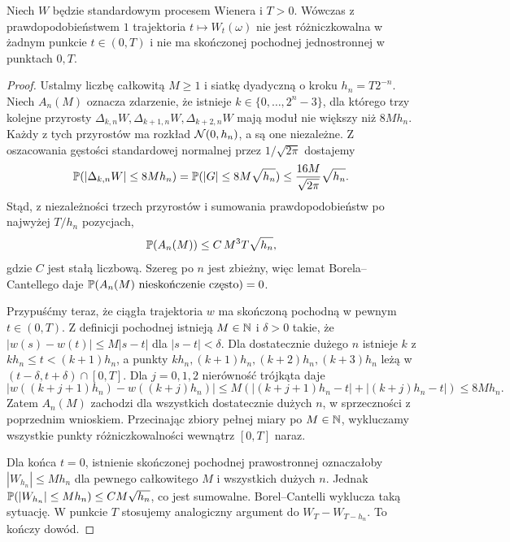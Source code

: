 \begin{twierdzenie}
Niech $W$ będzie standardowym procesem Wienera i $T>0$.
Wówczas z prawdopodobieństwem $1$ trajektoria
$t\mapsto W_t(\omega)$ nie jest różniczkowalna
w żadnym punkcie $t\in(0,T)$ i nie ma skończonej
pochodnej jednostronnej w punktach $0,T$.
\end{twierdzenie}
\begin{proof}
Ustalmy liczbę całkowitą $M\ge1$ i siatkę dyadyczną
o kroku $h_n=T2^{-n}$. Niech $A_n(M)$ oznacza zdarzenie,
że istnieje $k\in\{0,\ldots,2^n-3\}$, dla którego
trzy kolejne przyrosty
$\Delta_{k,n}W,\Delta_{k+1,n}W,\Delta_{k+2,n}W$
mają moduł nie większy niż $8Mh_n$.
Każdy z tych przyrostów ma rozkład $\mathcal{N}(0,h_n)$,
a są one niezależne. Z oszacowania gęstości standardowej
normalnej przez $1/\sqrt{2\pi}$ dostajemy
\[
\mathbb{P}(|\Delta_{k,n}W|\le8Mh_n)
=\mathbb{P}(|G|\le8M\sqrt{h_n})
\le \frac{16M}{\sqrt{2\pi}}\sqrt{h_n}.
\]
Stąd, z niezależności trzech przyrostów i sumowania
prawdopodobieństw po najwyżej $T/h_n$ pozycjach,
\[
\mathbb{P}(A_n(M))\le C\,M^3T\sqrt{h_n},
\]
gdzie $C$ jest stałą liczbową. Szereg po $n$ jest zbieżny,
więc lemat Borela--Cantellego daje
$\mathbb{P}(A_n(M)\text{ nieskończenie często})=0$.

Przypuśćmy teraz, że ciągła trajektoria $w$ ma skończoną
pochodną w pewnym $t\in(0,T)$. Z definicji pochodnej
istnieją $M\in\mathbb{N}$ i $\delta>0$ takie, że
$|w(s)-w(t)|\le M|s-t|$ dla $|s-t|<\delta$.
Dla dostatecznie dużego $n$ istnieje $k$ z
$kh_n\le t<(k+1)h_n$, a punkty
$kh_n,(k+1)h_n,(k+2)h_n,(k+3)h_n$
leżą w $(t-\delta,t+\delta)\cap[0,T]$.
Dla $j=0,1,2$ nierówność trójkąta daje
\[
|w((k+j+1)h_n)-w((k+j)h_n)|
\le M(|(k+j+1)h_n-t|+|(k+j)h_n-t|)
\le 8Mh_n.
\]
Zatem $A_n(M)$ zachodzi dla wszystkich dostatecznie
dużych $n$, w sprzeczności z poprzednim wnioskiem.
Przecinając zbiory pełnej miary po $M\in\mathbb{N}$,
wykluczamy wszystkie punkty różniczkowalności wewnątrz
$[0,T]$ naraz.

Dla końca $t=0$, istnienie skończonej pochodnej
prawostronnej oznaczałoby $|W_{h_n}|\le Mh_n$
dla pewnego całkowitego $M$ i wszystkich dużych $n$.
Jednak $\mathbb{P}(|W_{h_n}|\le Mh_n)\le C M\sqrt{h_n}$,
co jest sumowalne. Borel--Cantelli wyklucza taką
sytuację. W punkcie $T$ stosujemy analogiczny argument
do $W_T-W_{T-h_n}$. To kończy dowód.
\end{proof}

